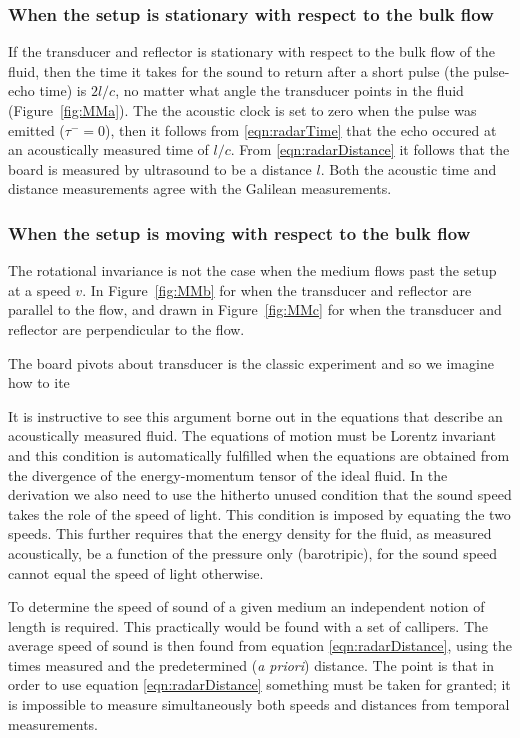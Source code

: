 \documentclass[10pt, fleqn,draft,showtrims,oldfontcommands]{article} %
\newcommand{\eqnref}[1]{\ref{eqn:#1}}
\newcommand{\figref}[1]{Figure~\ref{fig:#1}}
\newcommand{\tm}{\tau^-}
\begin{document}
\subsubsection{When the setup is stationary with respect to the bulk flow}
If the transducer and reflector  is stationary with respect to the bulk flow of the fluid,
then the time it takes for the sound to return after a short pulse (the pulse-echo time)
is $2l/c$, no matter what angle the transducer points in the fluid (\figref{MMa}).
The the acoustic clock is set to zero when the pulse was emitted ($\tm = 0$), 
then it follows from \eqnref{radarTime} that the echo occured  at an acoustically measured  time of $l/c$.
From \eqnref{radarDistance} it follows that the board is measured by ultrasound to be a distance $l$.
Both the acoustic time and distance measurements agree with the Galilean measurements.

\subsubsection{When the setup is moving with respect to the bulk flow}



The rotational invariance is not the case when the medium flows past the setup at a speed $v$.
In \figref{MMb} for when the transducer and reflector are parallel to the flow,
and drawn in \figref{MMc} for when the transducer and reflector are perpendicular to the flow.




The board pivots about transducer is the classic experiment and so we imagine how to ite

It is instructive to see this argument borne out in the equations that describe an acoustically measured fluid.
The equations of motion must  be Lorentz invariant and this condition  is automatically fulfilled  when  the equations 
are obtained from the divergence of the energy-momentum tensor of the ideal fluid.
In the derivation we also need to use the hitherto unused  condition
that the sound speed takes the role  of the speed of light.
This condition is imposed by equating the two speeds.
This further requires that the energy density for the fluid, as measured acoustically, be a function of the pressure only (barotripic),
for the sound speed cannot equal the speed of light otherwise\cite{Taub1978}.




To determine the speed of sound of a given medium an independent notion of length is required.
This practically would be found with a set of callipers.
The average speed of sound is then found from equation \eqnref{radarDistance},
using the times measured and the predetermined ({\em a priori})  distance.
The point is that %
in order to use equation \eqnref{radarDistance} something must be taken for granted; 
it is impossible to measure simultaneously both speeds and distances from temporal measurements.
\end{document}
